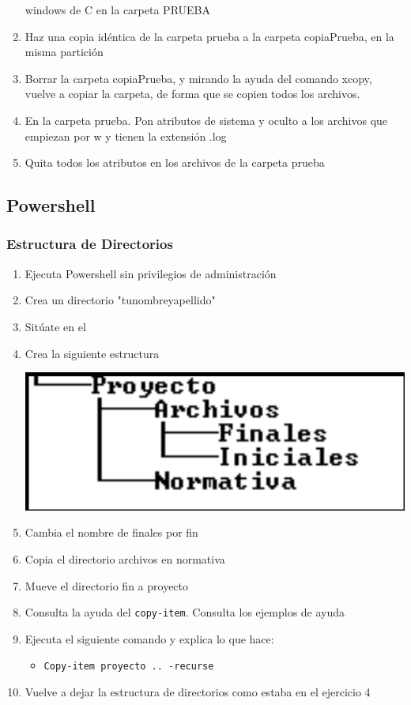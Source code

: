 \documentclass[11pt]{article}
\begin{document}
\begin{enumerate}
windows de C en la carpeta PRUEBA
\item Haz una copia idéntica de la carpeta prueba a la carpeta copiaPrueba, en la misma partición
\item Borrar la carpeta copiaPrueba, y mirando la ayuda del comando xcopy, vuelve a copiar la carpeta, de forma que se copien todos
los archivos.
\item En la carpeta prueba. Pon atributos de sistema y oculto a los archivos que empiezan por w y tienen la extensión .log
\item Quita todos los atributos en los archivos de la carpeta prueba
\end{enumerate}

\subsection{Powershell}
\label{sec:org6acdd92}
\subsubsection{Estructura de Directorios}
\label{sec:org545fcf6}
\begin{enumerate}
\item Ejecuta Powershell sin privilegios de administración
\item Crea un directorio "tunombreyapellido"
\item Sitúate en el
\item Crea la siguiente estructura
\begin{center}
\includegraphics[width=.9\linewidth]{../tipo-examen/img/2.png}
\end{center}
\item Cambia el nombre de finales por fin
\item Copia el directorio archivos en normativa
\item Mueve el directorio fin a proyecto
\item Consulta la ayuda del \texttt{copy-item}. Consulta los ejemplos de ayuda
\item Ejecuta el siguiente comando y explica lo que hace:
\begin{itemize}
\item \texttt{Copy-item proyecto .. -recurse}
\end{itemize}
\item Vuelve a dejar la estructura de directorios como estaba en el ejercicio 4
\end{enumerate}
\end{document}
